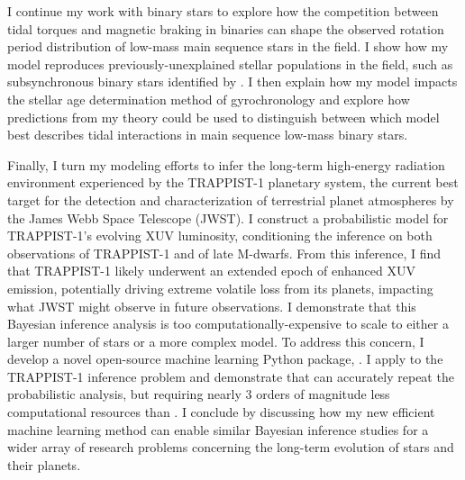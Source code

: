 {I continue my work with binary stars to explore how the competition between tidal torques and magnetic braking in binaries can shape the observed rotation period distribution of low-mass main sequence stars in the \kepler field. I show how my model reproduces previously-unexplained stellar populations in the \kepler field, such as subsynchronous binary stars identified by \citet{Lurie2017}. I then explain how my model impacts the stellar age determination method of gyrochronology and explore how predictions from my theory could be used to distinguish between which model best describes tidal interactions in main sequence low-mass binary stars.

Finally, I turn my modeling efforts to infer the long-term high-energy radiation environment experienced by the TRAPPIST-1 planetary system, the current best target for the detection and characterization of terrestrial planet atmospheres by the James Webb Space Telescope (JWST). I construct a probabilistic model for TRAPPIST-1's evolving XUV luminosity, conditioning the inference on both observations of TRAPPIST-1 and of late M-dwarfs. From this inference, I find that TRAPPIST-1 likely underwent an extended epoch of enhanced XUV emission, potentially driving extreme volatile loss from its planets, impacting what JWST might observe in future observations. I demonstrate that this Bayesian inference analysis is too computationally-expensive to scale to either a larger number of stars or a more complex model. To address this concern, I develop a novel open-source machine learning Python package, \approxposterior. I apply \approxposterior to the TRAPPIST-1 inference problem and demonstrate that \approxposterior can accurately repeat the probabilistic analysis, but requiring nearly 3 orders of magnitude less computational resources than \emcee. I conclude by discussing how my new efficient machine learning method can enable similar Bayesian inference studies for a wider array of research problems concerning the long-term evolution of stars and their planets.

}
